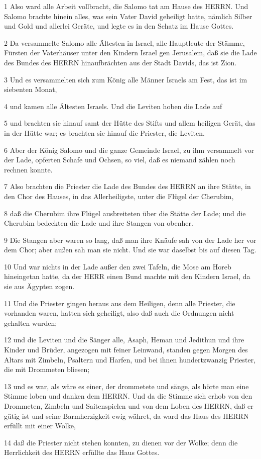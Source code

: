 \par 1 Also ward alle Arbeit vollbracht, die Salomo tat am Hause des HERRN. Und Salomo brachte hinein alles, was sein Vater David geheiligt hatte, nämlich Silber und Gold und allerlei Geräte, und legte es in den Schatz im Hause Gottes.
\par 2 Da versammelte Salomo alle Ältesten in Israel, alle Hauptleute der Stämme, Fürsten der Vaterhäuser unter den Kindern Israel gen Jerusalem, daß sie die Lade des Bundes des HERRN hinaufbrächten aus der Stadt Davids, das ist Zion.
\par 3 Und es versammelten sich zum König alle Männer Israels am Fest, das ist im siebenten Monat,
\par 4 und kamen alle Ältesten Israels. Und die Leviten hoben die Lade auf
\par 5 und brachten sie hinauf samt der Hütte des Stifts und allem heiligen Gerät, das in der Hütte war; es brachten sie hinauf die Priester, die Leviten.
\par 6 Aber der König Salomo und die ganze Gemeinde Israel, zu ihm versammelt vor der Lade, opferten Schafe und Ochsen, so viel, daß es niemand zählen noch rechnen konnte.
\par 7 Also brachten die Priester die Lade des Bundes des HERRN an ihre Stätte, in den Chor des Hauses, in das Allerheiligste, unter die Flügel der Cherubim,
\par 8 daß die Cherubim ihre Flügel ausbreiteten über die Stätte der Lade; und die Cherubim bedeckten die Lade und ihre Stangen von obenher.
\par 9 Die Stangen aber waren so lang, daß man ihre Knäufe sah von der Lade her vor dem Chor; aber außen sah man sie nicht. Und sie war daselbst bis auf diesen Tag.
\par 10 Und war nichts in der Lade außer den zwei Tafeln, die Mose am Horeb hineingetan hatte, da der HERR einen Bund machte mit den Kindern Israel, da sie aus Ägypten zogen.
\par 11 Und die Priester gingen heraus aus dem Heiligen, denn alle Priester, die vorhanden waren, hatten sich geheiligt, also daß auch die Ordnungen nicht gehalten wurden;
\par 12 und die Leviten und die Sänger alle, Asaph, Heman und Jedithun und ihre Kinder und Brüder, angezogen mit feiner Leinwand, standen gegen Morgen des Altars mit Zimbeln, Psaltern und Harfen, und bei ihnen hundertzwanzig Priester, die mit Drommeten bliesen;
\par 13 und es war, als wäre es einer, der drommetete und sänge, als hörte man eine Stimme loben und danken dem HERRN. Und da die Stimme sich erhob von den Drommeten, Zimbeln und Saitenspielen und von dem Loben des HERRN, daß er gütig ist und seine Barmherzigkeit ewig währet, da ward das Haus des HERRN erfüllt mit einer Wolke,
\par 14 daß die Priester nicht stehen konnten, zu dienen vor der Wolke; denn die Herrlichkeit des HERRN erfüllte das Haus Gottes.

